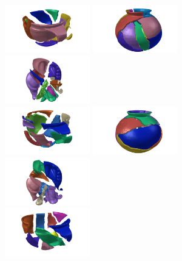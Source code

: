 \documentclass[acmlarge,screen,dvipsnames]{acmart}
\begin{document}
\begin{figure}[htb]
  \includegraphics[width=0.33\textwidth]{images/ambercuppuzzle4}%
  \includegraphics[width=0.33\textwidth]{images/saltdeanpuzzle2}%
  \includegraphics[width=0.33\textwidth]{images/elephantpuzzle2}\\
  \includegraphics[width=0.33\textwidth]{images/ambercuppuzzle5}%
  \includegraphics[width=0.33\textwidth]{images/saltdeanpuzzle3}%
  \includegraphics[width=0.33\textwidth]{images/elephantpuzzle3}\\
  \includegraphics[width=0.33\textwidth]{images/ambercuppuzzle6}%

\end{figure}
\end{document}
